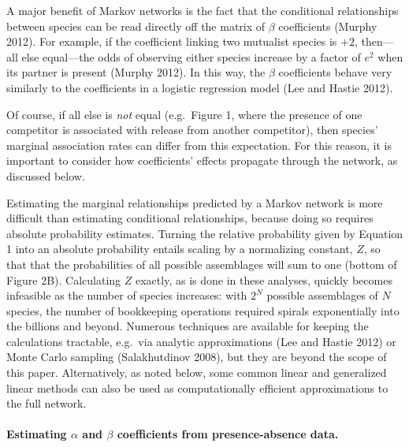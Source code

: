 \documentclass[12pt,]{article}
\begin{document}
\begin{spacing}{1.9}
\begin{flushleft}
A major benefit of Markov networks is the fact that the conditional
relationships between species can be read directly off the matrix of
\(\beta\) coefficients (Murphy 2012). For example, if the coefficient
linking two mutualist species is \(+2\), then---all else equal---the
odds of observing either species increase by a factor of \(e^2\) when
its partner is present (Murphy 2012). In this way, the \(\beta\)
coefficients behave very similarly to the coefficients in a logistic
regression model (Lee and Hastie 2012).

Of course, if all else is \emph{not} equal (e.g.~Figure 1, where the
presence of one competitor is associated with release from another
competitor), then species' marginal association rates can differ from
this expectation. For this reason, it is important to consider how
coefficients' effects propagate through the network, as discussed below.

Estimating the marginal relationships predicted by a Markov network is
more difficult than estimating conditional relationships, because doing
so requires absolute probability estimates. Turning the relative
probability given by Equation 1 into an absolute probability entails
scaling by a normalizing constant, \(Z\), so that that the probabilities
of all possible assemblages will sum to one (bottom of Figure 2B).
Calculating \(Z\) exactly, as is done in these analyses, quickly becomes
infeasible as the number of species increases: with \(2^N\) possible
assemblages of \(N\) species, the number of bookkeeping operations
required spirals exponentially into the billions and beyond. Numerous
techniques are available for keeping the calculations tractable,
e.g.~via analytic approximations (Lee and Hastie 2012) or Monte Carlo
sampling (Salakhutdinov 2008), but they are beyond the scope of this
paper. Alternatively, as noted below, some common linear and generalized
linear methods can also be used as computationally efficient
approximations to the full network.

\paragraph{\texorpdfstring{Estimating \(\alpha\) and \(\beta\)
coefficients from presence-absence
data.}{Estimating \textbackslash{}alpha and \textbackslash{}beta coefficients from presence-absence data.}}\label{estimating-alpha-and-beta-coefficients-from-presence-absence-data.}


\end{flushleft}
\end{spacing}
\end{document}
